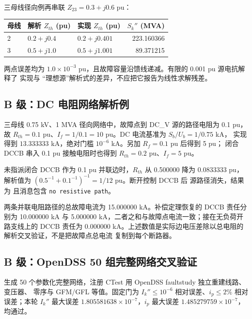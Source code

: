 三母线径向例再串联 $Z_{23}=0.3+j0.6$ pu：
\begin{center}\footnotesize
\begin{tabular}{@{}l l l r@{}}
\toprule
母线 & 解析 $Z_{th}$ (pu) & 实现 $Z_{th}$ (pu) & $S_k''$ (MVA)\\
\midrule
2 & $0.2+j0.4$ & $0.2+j0.401$ & 223.160366\\
3 & $0.5+j1.0$ & $0.5+j1.001$ & 89.371215\\
\bottomrule
\end{tabular}
\end{center}
两点误差均为 $1.0\times10^{-3}$ pu，且故障容量沿馈线递减。有限的 0.001 pu 源电抗解释了
实现与 ``理想源''解析式的差异，不应把它报告为线性求解残差。

\subsection{B 级：DC 电阻网络解析例}

三母线 0.75 kV、1 MVA 径向网络中，故障点到 DC\_V 源的路径电阻为 0.1 pu，故
$R_{th}=0.1$ pu、$I_f=1/0.1=10$ pu。DC 电流基准为 $S_b/U_b=1/0.75$ kA，
实现得到 $13.333333$ kA，绝对门槛 $10^{-6}$ kA。另加 $R_f=0.1$ pu 后得到 5 pu；
闭合 DCCB 串入 0.1 pu 接触电阻时也得到 $R_{th}=0.2$ pu、$I_f=5$ pu。

未指派闭合 DCCB 作为 0.1 pu 并联边时，$R_{th}$ 从 0.500000 降为
$0.0833333$ pu，解析值为 $(0.5^{-1}+0.1^{-1})^{-1}=1/12$ pu。断开控制 DCCB 后
源路径消失，结果为  且消息包含 \texttt{no resistive path}。

两条并联电阻路径的总故障电流为 15.000000 kA。补偿定理恢复的 DCCB 责任分别为
10.000000 kA 与 5.000000 kA，二者之和与故障点电流一致；接在无负荷开路支线上的 DCCB
责任为 0.000000 kA。上述数值是实际边电压差除以总电阻的解析交叉验证，不是把故障点总电流
复制到每个断路器。

\subsection{B 级：OpenDSS 50 组完整网络交叉验证}

 生成 50 个参数化完整网络，注册 CTest
 用 OpenDSS faultstudy 独立重建线路、变压器、
零序与 GFM/GFL 等值。固定门为 $I_k''\le10^{-6}$ 相对误差、$i_p\le2\%$ 相对误差；本轮
$I_k''$ 最大误差 $1.805581638\times10^{-7}$，$i_p$ 最大误差
$1.485279759\times10^{-7}$，均通过。

